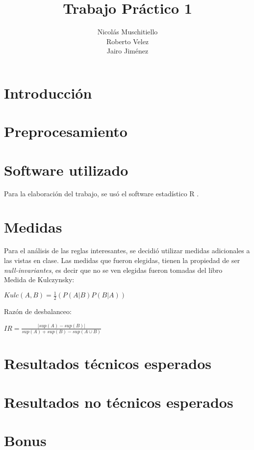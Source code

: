 \documentclass[]{article}
\title{Trabajo Práctico 1}
\author{Nicolás Muschitiello \\
	Roberto Velez\\
	Jairo Jiménez
	}
\begin{document}
\maketitle

\section{Introducción}

\section{Preprocesamiento}

\section{Software utilizado}
Para la elaboración del trabajo, se usó el software estadístico R \cite{RCran}.

\section{Medidas}
Para el análisis de las reglas interesantes, se decidió utilizar medidas adicionales a las vistas en clase. Las medidas que fueron elegidas, tienen la propiedad de ser \textit{null-invariantes}, es decir que no se ven  elegidas fueron tomadas del libro  \cite{Hall:2009:WDM:1656274.1656278}\\


Medida de Kulczynsky:

\begin{center}
	$Kulc(A,B)= \frac{1}{2}\left(P(A|B) P(B|A)\right)$	
\end{center}

Razón de desbalanceo:

\begin{center}
	$IR = \frac{|sup(A)- sup(B)|}{sup(A)+ sup(B)-sup(A \cup B)}$	
\end{center}
	


\section{Resultados técnicos esperados}

\section{Resultados no técnicos esperados}

\section{Bonus}



\end{document}
